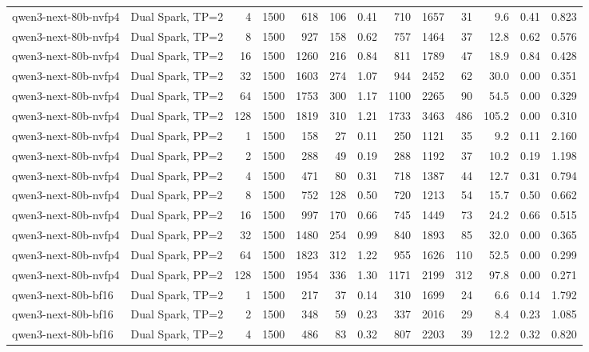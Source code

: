 \begin{tabular}{l l r r r r r r r r r r r}
qwen3-next-80b-nvfp4 & Dual Spark, TP=2 & 4 & 1500 & 618 & 106 & 0.41 & 710 & 1657 & 31 & 9.6 & 0.41 & 0.823 \\
qwen3-next-80b-nvfp4 & Dual Spark, TP=2 & 8 & 1500 & 927 & 158 & 0.62 & 757 & 1464 & 37 & 12.8 & 0.62 & 0.576 \\
qwen3-next-80b-nvfp4 & Dual Spark, TP=2 & 16 & 1500 & 1260 & 216 & 0.84 & 811 & 1789 & 47 & 18.9 & 0.84 & 0.428 \\
qwen3-next-80b-nvfp4 & Dual Spark, TP=2 & 32 & 1500 & 1603 & 274 & 1.07 & 944 & 2452 & 62 & 30.0 & 0.00 & 0.351 \\
qwen3-next-80b-nvfp4 & Dual Spark, TP=2 & 64 & 1500 & 1753 & 300 & 1.17 & 1100 & 2265 & 90 & 54.5 & 0.00 & 0.329 \\
qwen3-next-80b-nvfp4 & Dual Spark, TP=2 & 128 & 1500 & 1819 & 310 & 1.21 & 1733 & 3463 & 486 & 105.2 & 0.00 & 0.310 \\
\addlinespace
qwen3-next-80b-nvfp4 & Dual Spark, PP=2 & 1 & 1500 & 158 & 27 & 0.11 & 250 & 1121 & 35 & 9.2 & 0.11 & 2.160 \\
qwen3-next-80b-nvfp4 & Dual Spark, PP=2 & 2 & 1500 & 288 & 49 & 0.19 & 288 & 1192 & 37 & 10.2 & 0.19 & 1.198 \\
qwen3-next-80b-nvfp4 & Dual Spark, PP=2 & 4 & 1500 & 471 & 80 & 0.31 & 718 & 1387 & 44 & 12.7 & 0.31 & 0.794 \\
qwen3-next-80b-nvfp4 & Dual Spark, PP=2 & 8 & 1500 & 752 & 128 & 0.50 & 720 & 1213 & 54 & 15.7 & 0.50 & 0.662 \\
qwen3-next-80b-nvfp4 & Dual Spark, PP=2 & 16 & 1500 & 997 & 170 & 0.66 & 745 & 1449 & 73 & 24.2 & 0.66 & 0.515 \\
qwen3-next-80b-nvfp4 & Dual Spark, PP=2 & 32 & 1500 & 1480 & 254 & 0.99 & 840 & 1893 & 85 & 32.0 & 0.00 & 0.365 \\
qwen3-next-80b-nvfp4 & Dual Spark, PP=2 & 64 & 1500 & 1823 & 312 & 1.22 & 955 & 1626 & 110 & 52.5 & 0.00 & 0.299 \\
qwen3-next-80b-nvfp4 & Dual Spark, PP=2 & 128 & 1500 & 1954 & 336 & 1.30 & 1171 & 2199 & 312 & 97.8 & 0.00 & 0.271 \\
\addlinespace
qwen3-next-80b-bf16 & Dual Spark, TP=2 & 1 & 1500 & 217 & 37 & 0.14 & 310 & 1699 & 24 & 6.6 & 0.14 & 1.792 \\
qwen3-next-80b-bf16 & Dual Spark, TP=2 & 2 & 1500 & 348 & 59 & 0.23 & 337 & 2016 & 29 & 8.4 & 0.23 & 1.085 \\
qwen3-next-80b-bf16 & Dual Spark, TP=2 & 4 & 1500 & 486 & 83 & 0.32 & 807 & 2203 & 39 & 12.2 & 0.32 & 0.820 \\

\end{tabular}
